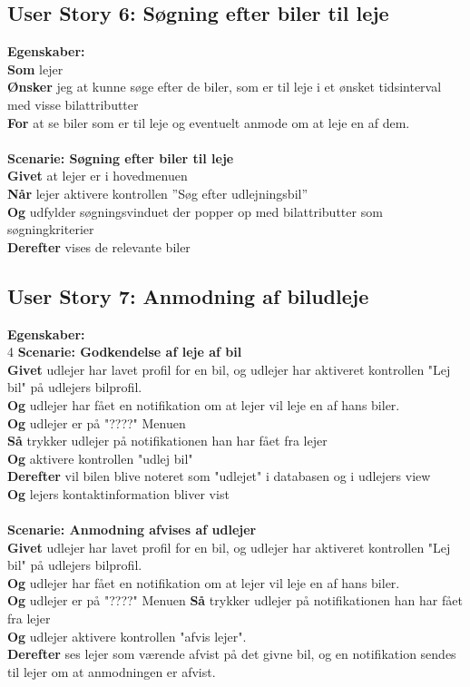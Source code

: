 \documentclass[Kravspecifikation/Kravspec_Main.tex]{subfiles}
\begin{document}
\subsection{User Story 6: Søgning efter biler til leje}
\textbf{Egenskaber:} \\
\textbf{Som} lejer \\
\textbf{Ønsker} jeg at kunne søge efter de biler, som er til leje i et ønsket tidsinterval med visse bilattributter \\
\textbf{For} at se biler som er til leje og eventuelt anmode om at leje en af dem.
\\\\
\textbf{Scenarie: Søgning efter biler til leje} \\
\textbf{Givet} at lejer er i hovedmenuen \\
\textbf{Når} lejer aktivere kontrollen ''Søg efter udlejningsbil'' \\
\textbf{Og} udfylder søgningsvinduet der popper op med bilattributter som søgningkriterier \\
\textbf{Derefter} vises de relevante biler

\subsection{User Story 7: Anmodning af biludleje}
\textbf{Egenskaber:} \\4
\textbf{Scenarie: Godkendelse af leje af bil} \\
\textbf{Givet} udlejer har lavet profil for en bil, og udlejer har aktiveret kontrollen "Lej bil" på udlejers bilprofil. \\
\textbf{Og} udlejer har fået en notifikation om at lejer vil leje en af hans biler.\\
\textbf{Og} udlejer er på "????" Menuen \\
\textbf{Så} trykker udlejer på notifikationen han har fået fra lejer \\
\textbf{Og} aktivere kontrollen "udlej bil" \\
\textbf{Derefter} vil bilen blive noteret som "udlejet" i databasen og i udlejers view \\
\textbf{Og} lejers kontaktinformation bliver vist
\\\\
\textbf{Scenarie: Anmodning afvises af udlejer}\\
\textbf{Givet} udlejer har lavet profil for en bil, og udlejer har aktiveret kontrollen "Lej bil" på udlejers bilprofil. \\
\textbf{Og} udlejer har fået en notifikation om at lejer vil leje en af hans biler.\\
\textbf{Og} udlejer er på "????" Menuen
\textbf{Så} trykker udlejer på notifikationen han har fået fra lejer \\
\textbf{Og} udlejer aktivere kontrollen "afvis lejer".\\
\textbf{Derefter} ses lejer som værende afvist på det givne bil, og en notifikation sendes til lejer om at anmodningen er afvist.
\end{document}
